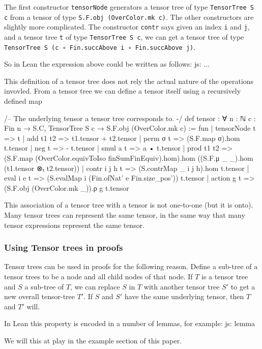 \documentclass[a4paper, 11pt]{article}
\newcommand{\js}[1]{ {\color{magenta} js:  #1}}
\begin{document}
The first constructor \lstinline|tensorNode| generators a tensor tree of type  
\lstinline|TensorTree S c| from a tensor of type \lstinline|S.F.obj (OverColor.mk c)|.
The other constructors are slightly more complicated. The constructor \lstinline|contr| says 
given an index \lstinline|i| and \lstinline|j|, and a tensor tree \lstinline|t| of type 
\lstinline|TensorTree S c|, we can get a tensor tree of type \lstinline|TensorTree S (c ∘ Fin.succAbove i ∘ Fin.succAbove j)|. 

So in Lean the expression above could be written as follows:
\js{...}


This definition of a tensor tree does not rely the actual nature of the operations invovled. 
From a tensor tree we can define a tensor itself using a recursively defined map 
\begin{code}
/-- The underlying tensor a tensor tree corresponds to. -/
def tensor : ∀ {n : ℕ} {c : Fin n → S.C}, TensorTree S c → S.F.obj (OverColor.mk c) := fun
  | tensorNode t => t
  | add t1 t2 => t1.tensor + t2.tensor
  | perm σ t => (S.F.map σ).hom t.tensor
  | neg t => - t.tensor
  | smul a t => a • t.tensor
  | prod t1 t2 => (S.F.map (OverColor.equivToIso finSumFinEquiv).hom).hom
    ((S.F.μ _ _).hom (t1.tensor ⊗ₜ t2.tensor))
  | contr i j h t => (S.contrMap _ i j h).hom t.tensor
  | eval i e t => (S.evalMap i (Fin.ofNat' e Fin.size_pos')) t.tensor
  | action g t => (S.F.obj (OverColor.mk _)).ρ g t.tensor
\end{code}
This association of a tensor tree with a tensor is not one-to-one (but it is onto).
Many tensor trees can represent the same tensor, in the same way that many 
tensor expressions represent the same tensor. 


\subsubsection{Using Tensor trees in proofs}
Tensor trees can be used in proofs for the following reason. Define a sub-tree of a tensor trees 
to be a node and all child nodes of that node. 
If $T$ is a tensor tree and $S$ a sub-tree of $T$, we can replace $S$ in $T$ 
with another tensor tree $S'$
to get a new overall tensor-tree $T'$. If $S$ and $S'$ have the same underlying tensor, 
then $T$ and $T'$ will. 

In Lean this property is encoded in a number of lemmas, for example: 
\js{lemma}

We will this at play in the example section of this paper.
\end{document}
